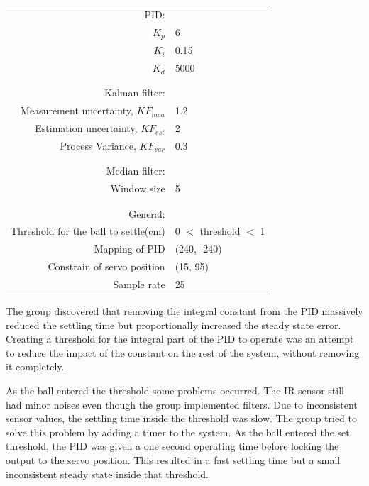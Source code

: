 \begin{tabular}{r l}
 
 PID: \\
    $K_p$ & 6\\
    $K_i$ & 0.15\\
    $K_d$ & 5000\\
    
    \\
    \hline
    \\

Kalman filter: \\
    Measurement uncertainty, $KF_{mea}$ & 1.2 \\
    Estimation uncertainty, $KF_{est}$ & 2 \\
    Process Variance, $KF_{var}$ & 0.3\\ \\
    \hline
    \\
Median filter:\\
    Window size & 5\\
    \\
    \hline
    \\
General: \\
Threshold for the ball to settle(cm) & 0 $<$ threshold $<$ 1\\
Mapping of PID & (240, -240)\\
Constrain of servo position & (15, 95)\\
Sample rate & 25\\
\end{tabular}

The group discovered that removing the integral constant from the PID massively reduced the settling time but proportionally increased the steady state error. Creating a threshold for the integral part of the PID to operate was an attempt to reduce the impact of the constant on the rest of the system, without removing it completely. 

As the ball entered the threshold some problems occurred. The IR-sensor still had minor noises even though the group implemented filters. Due to inconsistent sensor values, the settling time inside the threshold was slow. The group tried to solve this problem by adding a timer to the system. As the ball entered the set threshold, the PID was given a one second operating time before locking the output to the servo position. This resulted in a fast settling time but a small inconsistent steady state inside that threshold.

